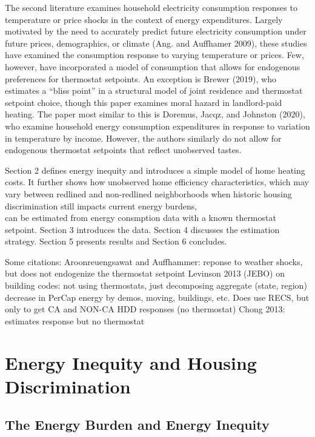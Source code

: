\documentclass[
]{article}
\begin{document}
The second literature
examines household electricity consumption responses to temperature or price shocks in the context of energy expenditures.
Largely motivated by the need to accurately predict future electricity consumption under future prices, demographics, or climate (Ang. and Auffhamer 2009),
these studies have examined the consumption response to varying temperature or prices. Few, however,
have incorporated a model of consumption that allows for endogenous preferences for thermostat setpoints. An exception is Brewer (2019), who estimates a ``bliss point''
in a structural model of joint residence and thermostat setpoint choice, though this paper examines moral hazard in landlord-paid heating.
The paper most similar to this is Doremus, Jacqz, and Johnston (2020), who examine household energy consumption expenditures in response to variation in temperature
by income. However, the authors similarly do not allow for endogenous thermostat setpoints that reflect unobserved tastes.

Section 2 defines energy inequity and introduces a simple model of home heating costs. It further shows how unobserved home efficiency characteristics,
which may vary between redlined and non-redlined neighborhoods when historic housing discrimination still impacts current energy burdens,\\
can be estimated from energy consmption data with a known thermostat setpoint. Section 3 introduces the data.
Section 4 discusses the estimation strategy. Section 5 presents results and Section 6 concludes.

Some citations: Aroonreuengsawat and Auffhammer: reponse to weather shocks, but does not endogenize the thermostat setpoint
Levinson 2013 (JEBO) on building codes: not using thermostats, just decomposing aggregate (state, region) decrease in PerCap energy by demos, moving, buildings, etc. Does use RECS, but only to get CA and NON-CA HDD responses (no thermostat)
Chong 2013: estimates response but no thermostat

\hypertarget{energy-inequity-and-housing-discrimination}{%
\section{Energy Inequity and Housing Discrimination}\label{energy-inequity-and-housing-discrimination}}

\hypertarget{the-energy-burden-and-energy-inequity}{%
\subsection{The Energy Burden and Energy Inequity}\label{the-energy-burden-and-energy-inequity}}
\end{document}

